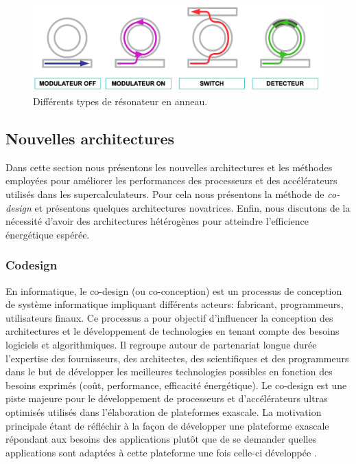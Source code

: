         \begin{figure}
            \center
            \includegraphics[width=14cm]{images/edl_photo_ring.png}
            \caption{\label{fig:edl_photo_ring} Différents types de résonateur en anneau.}
        \end{figure}


\subsection{Nouvelles architectures}\label{sec:new_soc}
    
    Dans cette section nous présentons les nouvelles architectures et les méthodes employées pour améliorer les performances des processeurs et des accélérateurs utilisés dans les supercalculateurs. Pour cela nous présentons la méthode de \textit{co-design} et présentons quelques architectures novatrices. Enfin, nous  discutons de la nécessité d'avoir des architectures hétérogènes pour atteindre l'efficience énergétique espérée.
    
    \subsubsection{Codesign}\label{sec:codesign}
        
        En informatique, le co-design (ou co-conception) est un processus de conception de système informatique impliquant différents acteurs: fabricant, programmeurs, utilisateurs finaux. Ce processus a pour objectif d'influencer la conception des architectures et le développement de technologies en tenant compte des besoins logiciels et algorithmiques. Il regroupe autour de partenariat longue durée l'expertise des fournisseurs, des architectes, des scientifiques et des programmeurs dans le but de développer les meilleures technologies possibles en fonction des besoins exprimés (coût, performance, efficacité énergétique). Le co-design est une piste majeure pour le développement de processeurs et d'accélérateurs ultras optimisés utilisés dans l'élaboration de plateformes \gls{exascale}. La motivation principale étant de réfléchir à la façon de développer une plateforme exascale répondant aux besoins des applications plutôt que de se demander quelles applications sont adaptées à cette plateforme une fois celle-ci développée \cite{PARKERe2013}.
        
